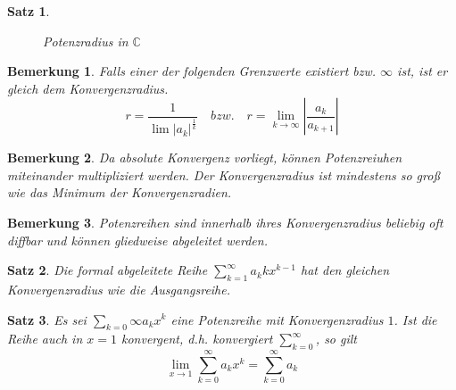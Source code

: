 \documentclass[12pt,a4paper]{article}%
\newtheorem{satz}{Satz}[section]
\newtheorem{bem}{Bemerkung}[section]
\numberwithin{equation}{section}
\newcommand{\C}{\mathbb{C}}
\numberwithin{equation}{subsection}
\begin{document}
\begin{satz}
\begin{figure}[H]
\begin{minipage}{.5\textwidth}
				  \caption{Potenzradius in $\C$ \protect\cite{HM12}}
				  \label{fig:reihe_potenzradius_c}
				\end{minipage}
      \end{figure}
	  \end{satz}
    \begin{bem}
      Falls einer der folgenden Grenzwerte existiert bzw. $\infty$ ist, ist er gleich dem Konvergenzradius.
      \begin{equation*}
        r = \frac{1}{\lim |a_k|^\frac{1}{k}} \quad bzw. \quad r = \lim\limits_{k \rightarrow \infty} \left| \frac{a_k}{a_{k+1}}\right|
      \end{equation*}
    \end{bem}	  
    \begin{bem}
      Da absolute Konvergenz vorliegt, können Potenzreiuhen miteinander multipliziert werden. Der Konvergenzradius ist mindestens so groß wie das Minimum der Konvergenzradien.
    \end{bem}
	  \begin{bem}
	    Potenzreihen sind innerhalb ihres Konvergenzradius beliebig oft diffbar und können gliedweise abgeleitet werden.
	  \end{bem}
	  \begin{satz}
	    Die formal abgeleitete Reihe $\sum\limits_{k = 1}^\infty a_k kx^{k-1}$ hat den gleichen Konvergenzradius wie die Ausgangsreihe.
	  \end{satz}
	  \begin{satz}
	    Es sei $\sum\limits_{k=0}\infty a_k x^k$ eine Potenzreihe mit Konvergenzradius $1$. Ist die Reihe auch in $x = 1$ konvergent, d.h. konvergiert $\sum\limits_{k = 0}^\infty$, so gilt
	    \begin{equation}
	      \lim\limits_{x\rightarrow 1} \sum\limits_{k = 0}^\infty a_k x^k = \sum\limits_ {k = 0}^\infty a_k
	    \end{equation}
	  \end{satz}
\newpage	  
	  
\end{document}
